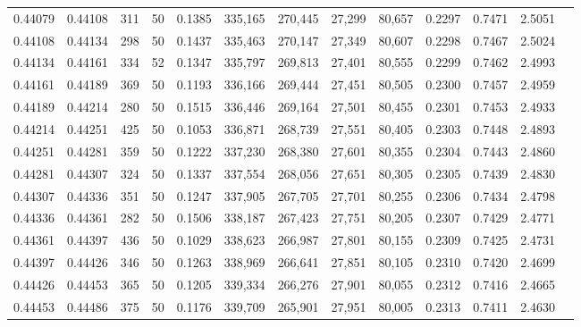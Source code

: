 \begin{tabular}{rrrrrrrrrrrrr}
0.44079 & 0.44108 &   311 &  50 &                                     0.1385 & 335,165 & 270,445 &  27,299 &  80,657 & 0.2297 & 0.7471 & 2.5051 \\
0.44108 & 0.44134 &   298 &  50 &                                     0.1437 & 335,463 & 270,147 &  27,349 &  80,607 & 0.2298 & 0.7467 & 2.5024 \\
0.44134 & 0.44161 &   334 &  52 &                                     0.1347 & 335,797 & 269,813 &  27,401 &  80,555 & 0.2299 & 0.7462 & 2.4993 \\
0.44161 & 0.44189 &   369 &  50 &                                     0.1193 & 336,166 & 269,444 &  27,451 &  80,505 & 0.2300 & 0.7457 & 2.4959 \\
0.44189 & 0.44214 &   280 &  50 &                                     0.1515 & 336,446 & 269,164 &  27,501 &  80,455 & 0.2301 & 0.7453 & 2.4933 \\
0.44214 & 0.44251 &   425 &  50 &                                     0.1053 & 336,871 & 268,739 &  27,551 &  80,405 & 0.2303 & 0.7448 & 2.4893 \\
0.44251 & 0.44281 &   359 &  50 &                                     0.1222 & 337,230 & 268,380 &  27,601 &  80,355 & 0.2304 & 0.7443 & 2.4860 \\
0.44281 & 0.44307 &   324 &  50 &                                     0.1337 & 337,554 & 268,056 &  27,651 &  80,305 & 0.2305 & 0.7439 & 2.4830 \\
0.44307 & 0.44336 &   351 &  50 &                                     0.1247 & 337,905 & 267,705 &  27,701 &  80,255 & 0.2306 & 0.7434 & 2.4798 \\
0.44336 & 0.44361 &   282 &  50 &                                     0.1506 & 338,187 & 267,423 &  27,751 &  80,205 & 0.2307 & 0.7429 & 2.4771 \\
0.44361 & 0.44397 &   436 &  50 &                                     0.1029 & 338,623 & 266,987 &  27,801 &  80,155 & 0.2309 & 0.7425 & 2.4731 \\
0.44397 & 0.44426 &   346 &  50 &                                     0.1263 & 338,969 & 266,641 &  27,851 &  80,105 & 0.2310 & 0.7420 & 2.4699 \\
0.44426 & 0.44453 &   365 &  50 &                                     0.1205 & 339,334 & 266,276 &  27,901 &  80,055 & 0.2312 & 0.7416 & 2.4665 \\
0.44453 & 0.44486 &   375 &  50 &                                     0.1176 & 339,709 & 265,901 &  27,951 &  80,005 & 0.2313 & 0.7411 & 2.4630 \\

\end{tabular}
